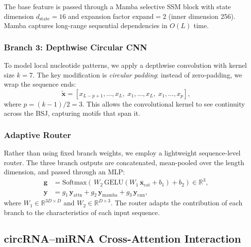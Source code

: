 \documentclass[10pt,twocolumn]{article}
\begin{document}
The base feature is passed through a Mamba selective SSM block
\cite{gu2023mamba} with state dimension $d_{\text{state}}{=}16$ and
expansion factor $\text{expand}{=}2$ (inner dimension 256).
Mamba captures long-range sequential dependencies in $O(L)$ time.

\subsubsection{Branch 3: Depthwise Circular CNN}

To model local nucleotide patterns, we apply a depthwise convolution
with kernel size $k{=}7$. The key modification is \emph{circular padding}:
instead of zero-padding, we wrap the sequence ends:
\begin{equation}
  \tilde{\mathbf{x}} = [x_{L-p+1}, \ldots, x_L,\; x_1, \ldots, x_L,\; x_1, \ldots, x_p],
\end{equation}
where $p = (k-1)/2 = 3$. This allows the convolutional kernel to see
continuity across the BSJ, capturing motifs that span it.

\subsubsection{Adaptive Router}

Rather than using fixed branch weights, we employ a lightweight
sequence-level router. The three branch outputs are concatenated,
mean-pooled over the length dimension, and passed through an MLP:
\begin{align}
  \mathbf{g} &= \text{Softmax}\!\left(\,
    W_2\,\text{GELU}(W_1\,\overline{\mathbf{x}}_{\text{cat}} + b_1) + b_2
  \right) \in \mathbb{R}^3, \\
  \mathbf{y} &= g_1\,\mathbf{y}_{\text{attn}}
             + g_2\,\mathbf{y}_{\text{mamba}}
             + g_3\,\mathbf{y}_{\text{cnn}},
\end{align}
where $W_1 \in \mathbb{R}^{3D \times D}$ and $W_2 \in \mathbb{R}^{D \times 3}$.
The router adapts the contribution of each branch to the characteristics
of each input sequence.

\subsection{circRNA--miRNA Cross-Attention Interaction}
\label{sec:interaction}
\end{document}
